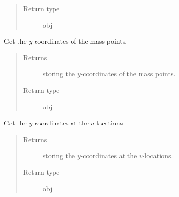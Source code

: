 \documentclass[letterpaper,10pt,english]{sphinxmanual}
\begin{document}
\begin{fulllineitems}
\begin{fulllineitems}
\begin{quote}
\begin{description}
\item[{Return type}] \leavevmode
obj

\end{description}\end{quote}

\end{fulllineitems}


\begin{fulllineitems}
\label{\detokenize{api:grids.grid_xyz.GridXYZ.y}}
Get the \(y\)-coordinates of the mass points.
\begin{quote}\begin{description}
\item[{Returns}] \leavevmode
{\hyperref[\detokenize{api:grids.axis.Axis}]{}} storing the \(y\)-coordinates of the mass points.

\item[{Return type}] \leavevmode
obj

\end{description}\end{quote}

\end{fulllineitems}


\begin{fulllineitems}
\label{\detokenize{api:grids.grid_xyz.GridXYZ.y_at_v_locations}}
Get the \(y\)-coordinates at the \(v\)-locations.
\begin{quote}\begin{description}
\item[{Returns}] \leavevmode
{\hyperref[\detokenize{api:grids.axis.Axis}]{}} storing the \(y\)-coordinates at the \(v\)-locations.

\item[{Return type}] \leavevmode
obj

\end{description}\end{quote}

\end{fulllineitems}


\end{fulllineitems}

\end{document}

